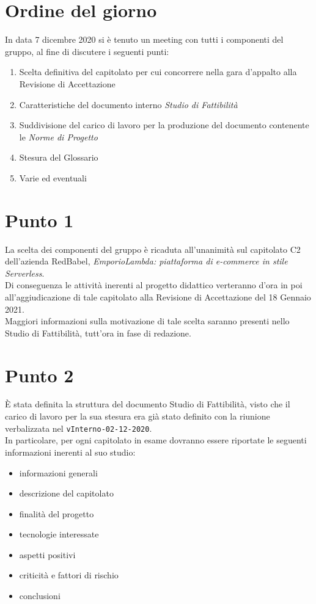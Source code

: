 \documentclass[12pt,italian,a4paper]{article}
\begin{document}
	\newpage
	
	
	\section*{Ordine del giorno}
	In data 7 dicembre 2020 si è tenuto un meeting con tutti i componenti del gruppo, al fine di discutere i seguenti punti:
	\begin{enumerate}
		\item Scelta definitiva del capitolato per cui concorrere nella gara d'appalto alla Revisione di Accettazione
		\item Caratteristiche del documento interno \textit{Studio di Fattibilità}
		\item Suddivisione del carico di lavoro per la produzione del documento contenente le \textit{Norme di Progetto}
		\item Stesura del Glossario
		\item Varie ed eventuali
	\end{enumerate}
	
	\section*{Punto 1}
	La scelta dei componenti del gruppo è ricaduta all'unanimità sul capitolato C2 dell'azienda RedBabel, \textit{EmporioLambda: piattaforma di e-commerce in stile Serverless}.\\
	Di conseguenza le attività inerenti al progetto didattico verteranno d'ora in poi all'aggiudicazione di tale capitolato alla Revisione di Accettazione del 18 Gennaio 2021.\\
	Maggiori informazioni sulla motivazione di tale scelta saranno presenti nello Studio di Fattibilità, tutt'ora in fase di redazione.
	
	\section*{Punto 2}
	È stata definita la struttura del documento Studio di Fattibilità, visto che il carico di lavoro per la sua stesura era già stato definito con la riunione verbalizzata nel \verb|vInterno-02-12-2020|.\\
	In particolare, per ogni capitolato in esame dovranno essere riportate le seguenti informazioni inerenti al suo studio:
	\begin{itemize}
		\item informazioni generali
		\item descrizione del capitolato
		\item finalità del progetto
		\item tecnologie interessate
		\item aspetti positivi
		\item criticità e fattori di rischio
		\item conclusioni
	\end{itemize}
	
\end{document}
